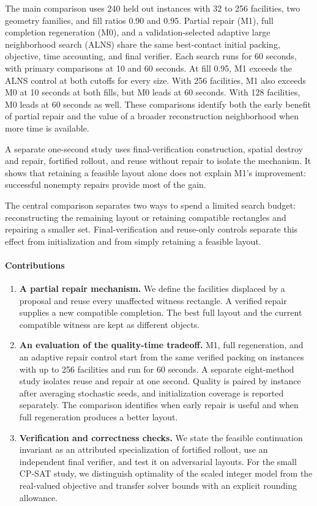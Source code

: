 \documentclass[preprint,12pt,authoryear,nonatbib]{elsarticle}
\begin{document}
The main comparison uses 240 held out instances with 32 to 256 facilities,
two geometry families, and fill ratios 0.90 and 0.95. Partial repair (M1), full
completion regeneration (M0), and a validation-selected adaptive large
neighborhood search (ALNS) share the same best-contact initial packing,
objective, time accounting, and final verifier. Each search runs for 60 seconds,
with primary comparisons at 10 and 60 seconds. At fill 0.95, M1 exceeds the
ALNS control at both cutoffs for every size. With 256 facilities, M1 also
exceeds M0 at 10 seconds at both fills, but M0 leads at 60 seconds. With
128 facilities, M0 leads at 60 seconds as well. These comparisons identify
both the early benefit of partial repair and the value of a broader
reconstruction neighborhood when more time is available.

A separate one-second study uses final-verification construction, spatial
destroy and repair, fortified rollout, and reuse without repair to isolate the
mechanism. It shows that retaining a feasible layout alone does not explain
M1's improvement: successful nonempty repairs provide most of the gain.

The central comparison separates two ways to spend a limited search budget:
reconstructing the remaining layout or retaining compatible rectangles and
repairing a smaller set. Final-verification and reuse-only controls separate
this effect from initialization and from simply retaining a feasible layout.

\paragraph{Contributions}
\begin{enumerate}
\item \textbf{A partial repair mechanism.} We define the facilities displaced
by a proposal and reuse every unaffected witness rectangle. A verified repair
supplies a new compatible completion. The best full layout and the current
compatible witness are kept as different objects.

\item \textbf{An evaluation of the quality-time tradeoff.} M1, full regeneration,
and an adaptive repair control start from the same verified packing on
instances with up to 256 facilities and run for 60 seconds. A separate
eight-method study isolates reuse and repair at one second. Quality is paired
by instance after averaging stochastic seeds, and initialization coverage is
reported separately. The comparison identifies when early repair is useful
and when full regeneration produces a better layout.

\item \textbf{Verification and correctness checks.} We state the feasible
continuation invariant as an attributed specialization of fortified rollout,
use an independent final verifier, and test it on adversarial layouts. For the
small CP-SAT study, we distinguish optimality of the scaled integer model from
the real-valued objective and transfer solver bounds with an explicit rounding
allowance.
\end{enumerate}
\end{document}
